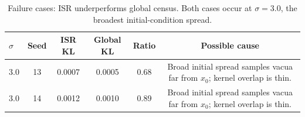 \begin{table}[t]
  \centering
  \caption{Failure cases: ISR underperforms global census. Both cases occur at $\sigma=3.0$, the broadest initial-condition spread.}
  \label{tab:failure_cases}
  \begin{tabular}{lccccc}
    \toprule
    $\sigma$ & Seed & ISR KL & Global KL & Ratio & Possible cause \\
    \midrule
    3.0 & 13 & 0.0007 & 0.0005 & 0.68 & Broad initial spread samples vacua far from $x_0$; kernel overlap is thin. \\
    3.0 & 14 & 0.0012 & 0.0010 & 0.89 & Broad initial spread samples vacua far from $x_0$; kernel overlap is thin. \\
    \bottomrule
  \end{tabular}
\end{table}
